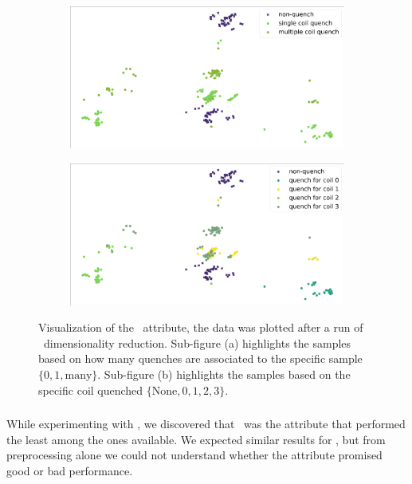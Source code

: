 \begin{figure}[!ht]
	\centering
	\begin{subfigure}{0.8\linewidth}
		\centering
		\includegraphics[width=\linewidth]{img/quench_dist_qlp/single_vs_multiple_An.png}
		\subcaption{}
	\end{subfigure}
	\begin{subfigure}{0.8\linewidth}
		\centering
		\includegraphics[width=\linewidth]{img/quench_dist_qlp_an.png}
		\subcaption{}
	\end{subfigure}
	\caption{Visualization of the \an\ attribute, the data was plotted after a run of \pca\
		dimensionality reduction. Sub-figure (a) highlights the samples based on how many quenches
		are associated to the specific sample $\{0, 1, \text{many}\}$. Sub-figure (b) highlights the
		samples based on the specific coil quenched $\{\text{None}, 0, 1, 2, 3\}$.}\label{fig:an-coilq-dist}
\end{figure}

\subsubsection{\bn}
While experimenting with \qrp, we discovered that \bn\ was the attribute that performed the least
among the ones available. We expected similar results for \qlp, but from preprocessing alone we
could not understand whether the attribute promised good or bad performance.

